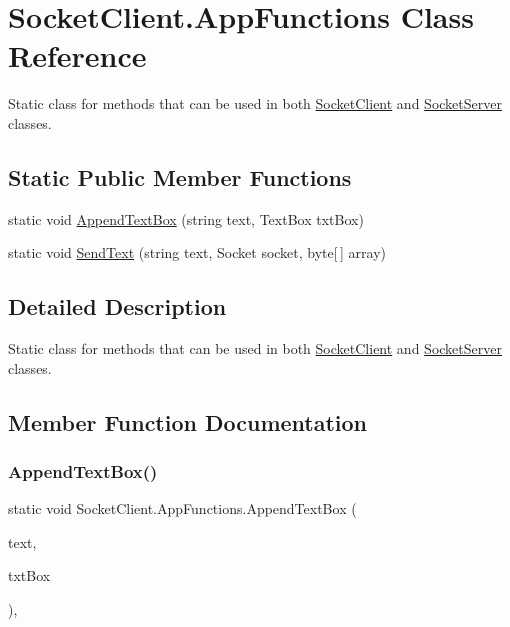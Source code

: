 \hypertarget{class_socket_client_1_1_app_functions}{}\section{Socket\+Client.\+App\+Functions Class Reference}
\label{class_socket_client_1_1_app_functions}


Static class for methods that can be used in both \hyperlink{class_socket_client_1_1_socket_client}{Socket\+Client} and \hyperlink{namespace_socket_server}{Socket\+Server} classes.  


\subsection*{Static Public Member Functions}
\begin{DoxyCompactItemize}
\item 
static void \hyperlink{class_socket_client_1_1_app_functions_a94969c8e5b44ab786b93c8eea39634ac}{Append\+Text\+Box} (string text, Text\+Box txt\+Box)
\item 
static void \hyperlink{class_socket_client_1_1_app_functions_a4050a5f5c5779c67f0579bc5ad890cf1}{Send\+Text} (string text, Socket socket, byte\mbox{[}$\,$\mbox{]} array)
\end{DoxyCompactItemize}


\subsection{Detailed Description}
Static class for methods that can be used in both \hyperlink{class_socket_client_1_1_socket_client}{Socket\+Client} and \hyperlink{namespace_socket_server}{Socket\+Server} classes. 



\subsection{Member Function Documentation}
\mbox{\label{class_socket_client_1_1_app_functions_a94969c8e5b44ab786b93c8eea39634ac}} 
\subsubsection{\texorpdfstring{Append\+Text\+Box()}{AppendTextBox()}}
{\footnotesize\ttfamily static void Socket\+Client.\+App\+Functions.\+Append\+Text\+Box (\begin{DoxyParamCaption}\item[{string}]{text,  }\item[{Text\+Box}]{txt\+Box }\end{DoxyParamCaption})\hspace{0.3cm}{\ttfamily [inline]}, {\ttfamily [static]}}

